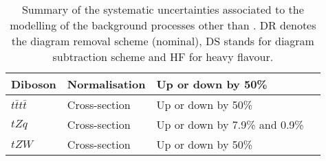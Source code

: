 \begin{table}[htbp]
\begin{tabular}{llll}
  Diboson     & Normalisation & Up or down by 50\% \\
  \midrule
  $t\bar{t}t\bar{t}$  & Cross-section &  Up or down by 50\% \\
  $tZq$  & Cross-section &  Up or down by 7.9\% and 0.9\% \\
  $tZW$  & Cross-section &  Up or down by 50\% \\
  \bottomrule\bottomrule
  \end{tabular}
  \caption{
    Summary of the systematic uncertainties associated to the modelling of the background processes
    other than \ttbar. DR denotes the diagram removal scheme (nominal), DS stands for diagram subtraction scheme and HF for heavy flavour.
  }
  \label{Hplustb:tablesysalt}
\end{table}